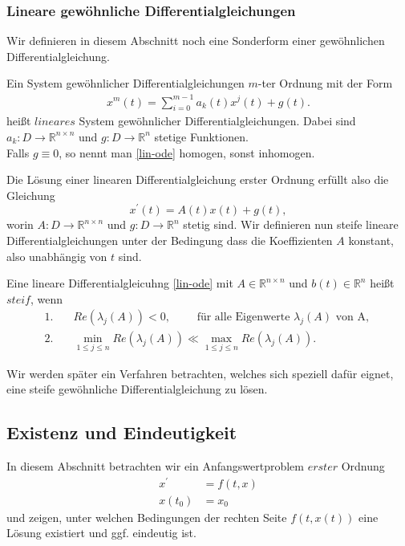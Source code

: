 \subsubsection{Lineare gewöhnliche Differentialgleichungen}
Wir definieren in diesem Abschnitt noch eine Sonderform einer gewöhnlichen Differentialgleichung.
\begin{definition}
    Ein System gewöhnlicher Differentialgleichungen $m$-ter Ordnung mit der Form
    \begin{align} \label{lin-ode}
    x^{m}(t) = \sum_{i=0}^{m-1} a_k(t) x^{j}(t) + g(t).
    \end{align}
    heißt $lineares$ System gewöhnlicher Differentialgleichungen.
    Dabei sind $a_k : D \rightarrow \mathbb{R}^{n \times n}$ und $g : D \rightarrow \mathbb{R}^n$ stetige Funktionen.\\
    Falls $g \equiv 0$, so nennt man \eqref{lin-ode} homogen, sonst inhomogen.
\end{definition}
Die Lösung einer linearen Differentialgleichung erster Ordnung erfüllt also die Gleichung
\[
    x^{\prime}(t) = A(t)x(t) + g(t),
\]
worin $A:D \rightarrow \mathbb{R}^{n \times n}$ und $g:D \rightarrow \mathbb{R}^n$ stetig sind. Wir definieren nun steife lineare
Differentialgleichungen unter der Bedingung dass die Koeffizienten $A$ konstant, also unabhängig von $t$ sind.
\begin{definition}
    \label{steife-dgl}
    Eine lineare Differentialgleicuhng \eqref{lin-ode} mit $A \in \mathbb{R}^{n \times n}$ und
    $b(t) \in \mathbb{R}^n$ heißt $steif$, wenn
    \begin{align}
        1.& \quad Re(\lambda_j(A)) < 0, \qquad \text{ für alle Eigenwerte } \lambda_j(A) \text{ von A, }\\
        2.& \quad \min\limits_{1 \leq j \leq n} Re(\lambda_j(A)) \ll \max\limits_{1 \leq j \leq n} Re(\lambda_j(A)).
    \end{align}
\end{definition}
Wir werden später ein Verfahren betrachten, welches sich speziell dafür eignet, eine steife gewöhnliche
Differentialgleichung zu lösen.

\subsection{Existenz und Eindeutigkeit}
In diesem Abschnitt betrachten wir ein Anfangswertproblem $erster$ Ordnung
\begin{align}
    x^{\prime}&=f(t,x) \nonumber \\
    x(t_{0})&=x_{0} \label{firstorder-ode}
\end{align}
und zeigen, unter welchen Bedingungen der rechten Seite $f(t,x(t))$ eine Lösung existiert und ggf. eindeutig ist.

